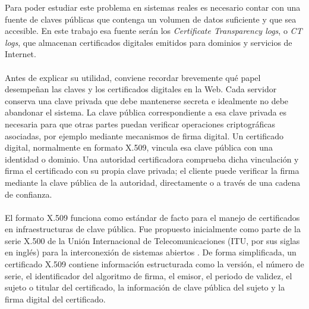 Para poder estudiar este problema en sistemas reales es necesario contar con una fuente de claves públicas que contenga un volumen de datos suficiente y que sea accesible. En este trabajo esa fuente serán los \textit{Certificate Transparency logs}, o \textit{CT logs}, que almacenan certificados digitales emitidos para dominios y servicios de Internet.
\\
\\
Antes de explicar su utilidad, conviene recordar brevemente qué papel desempeñan las claves y los certificados digitales en la Web. Cada servidor conserva una clave privada que debe mantenerse secreta e idealmente no debe abandonar el sistema. La clave pública correspondiente a esa clave privada es necesaria para que otras partes puedan verificar operaciones criptográficas asociadas, por ejemplo mediante mecanismos de firma digital. Un certificado digital, normalmente en formato X.509, vincula esa clave pública con una identidad o dominio. Una autoridad certificadora comprueba dicha vinculación y firma el certificado con su propia clave privada; el cliente puede verificar la firma mediante la clave pública de la autoridad, directamente o a través de una cadena de confianza.
\\
\\
El formato X.509 funciona como estándar de facto para el manejo de certificados en infraestructuras de clave pública. Fue propuesto inicialmente como parte de la serie X.500 de la Unión Internacional de Telecomunicaciones (ITU, por sus siglas en inglés) para la interconexión de sistemas abiertos \citep{ITU1988X500}. De forma simplificada, un certificado X.509 contiene información estructurada como la versión, el número de serie, el identificador del algoritmo de firma, el emisor, el periodo de validez, el sujeto o titular del certificado, la información de clave pública del sujeto y la firma digital del certificado.

